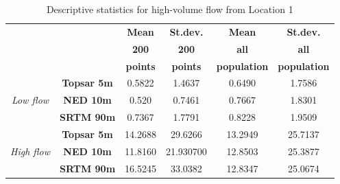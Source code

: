 \documentclass[12pt,letterpaper]{article}
\begin{document}
  \begin{table} [H]
    \caption{ Descriptive statistics for high-volume flow from Location 1}
    \label{tab:Table6}
    \begin{tabular}{c c c c c c}
      \hline
      &&\textbf{Mean} & \textbf{St.dev.} & \textbf{Mean} & \textbf{St.dev.} \\
      &&\textbf{200}&\textbf{200}&\textbf{all}&\textbf{all} \\
      &&\textbf{points}&\textbf{points}&\textbf{population}&\textbf{population} \\
      \hline
      \multirow{3}{*}{\textit{Low flow}}&\textbf{Topsar 5m} & 0.5822 & 1.4637 & 0.6490 & 1.7586 \\ 
      &\textbf{NED 10m} & 0.520 & 0.7461 & 0.7667 & 1.8301 \\ 
      &\textbf{SRTM 90m} & 0.7367 & 1.7791 & 0.8228 & 1.9509 \\ \hline
      \hline
      \multirow{3}{*}{\textit{High flow}}&\textbf{Topsar 5m} & 14.2688 & 29.6266 & 13.2949 & 25.7137 \\ 
      &\textbf{NED 10m} & 11.8160 & 21.930700 & 12.8503 & 25.3877 \\ 
      &\textbf{SRTM 90m} & 16.5245 & 33.0382 & 12.8347 & 25.0674 \\ \hline
    \end{tabular}
  \end{table}
\end{document}
